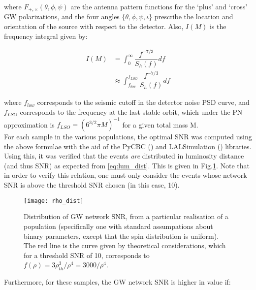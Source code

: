        where $F_{+, \times}(\theta, \phi, \psi)$ are the antenna pattern functions for
        the `plus' and `cross' GW polarizations, and the four angles $\{\theta, \phi,
        \psi, \iota\}$ prescribe the location and orientation of the source with respect
        to the detector. Also, $I(M)$ is the frequency integral given by:

        \begin{align}
            I(M) &= \int_0^\infty \dfrac{f^{-7/3}}{S_h(f)} df \\
                 &\approx \int_{f_{low}}^{f_{LSO}} \dfrac{f^{-7/3}}{S_h(f)} df
            \label{eq:freq_integral}
        \end{align}

        where $f_{low}$ corresponds to the seismic cutoff in the detector noise PSD
        curve, and $f_{LSO}$ corresponds to the frequency at the last stable orbit,
        which under the PN approximation is $f_{LSO} = (6^{3/2} \pi M)^{-1}$ for a given
        total mass M.\\
        For each sample in the various populations, the optimal SNR was computed using
        the above formulae with the aid of the PyCBC (\cite{pycbc}) and LALSimulation
        (\cite{lalsuite}) libraries. Using this, it was verified that the events
        \textit{are} distributed in luminosity distance (and thus SNR) as expected from
        \ref{eq:lum_dist}. This is given in Fig.\ref{fig:rho_dist}. Note that
        in order to verify this relation, one must only consider the events whose
        network SNR is above the threshold SNR chosen (in this case, 10).\\

        \begin{figure}[H]
            \centering
            \texttt{[image: rho\_dist]}
            \caption[Distribution of GW network SNR]{
                Distribution of GW network SNR, from a particular realisation of a
                population (specifically one with standard assumpations about binary
                parameters, except that the spin distribution is uniform). The red line
                is the curve given by theoretical considerations, which for a threshold
                SNR of 10, corresponds to $f(\rho) = 3\rho_{th}^3 / \rho^4 = 3000 /
                \rho^4$.
            }
            \label{fig:rho_dist}
        \end{figure}


        Furthermore, for these samples, the GW network SNR is higher in value if:


